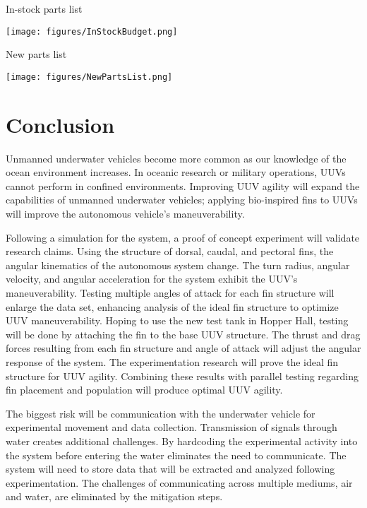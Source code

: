 \documentclass[]{IEEEtran}
\begin{document}
\begin{table*}[p]
\caption{In-stock parts list}
\label{tab:3}
\begin{center}
\texttt{[image: figures/InStockBudget.png]}
\end{center}
\end{table*}

\begin{table*}[p]
\caption{New parts list}
\label{tab:4}
\begin{center}
\texttt{[image: figures/NewPartsList.png]}
\end{center}
\end{table*}

\section{Conclusion}
Unmanned underwater vehicles become more common as our knowledge of the ocean environment increases.  In oceanic research or military operations, UUVs cannot perform in confined environments.  Improving UUV agility will expand the capabilities of unmanned underwater vehicles; applying bio-inspired fins to UUVs will improve the autonomous vehicle’s maneuverability.  

Following a simulation for the system, a proof of concept experiment will validate research claims.  Using the structure of dorsal, caudal, and pectoral fins, the angular kinematics of the autonomous system change.  The turn radius, angular velocity, and angular acceleration for the system exhibit the UUV’s maneuverability.  Testing multiple angles of attack for each fin structure will enlarge the data set, enhancing analysis of the ideal fin structure to optimize UUV maneuverability.  Hoping to use the new test tank in Hopper Hall, testing will be done by attaching the fin to the base UUV structure.  The thrust and drag forces resulting from each fin structure and angle of attack will adjust the angular response of the system.  The experimentation research will prove the ideal fin structure for UUV agility.  Combining these results with parallel testing regarding fin placement and population will produce optimal UUV agility.   

The biggest risk will be communication with the underwater vehicle for experimental movement and data collection.  Transmission of signals through water creates additional challenges.  By hardcoding the experimental activity into the system before entering the water eliminates the need to communicate.  The system will need to store data that will be extracted and analyzed following experimentation.  The challenges of communicating across multiple mediums, air and water, are eliminated by the mitigation steps.  
\end{document}
